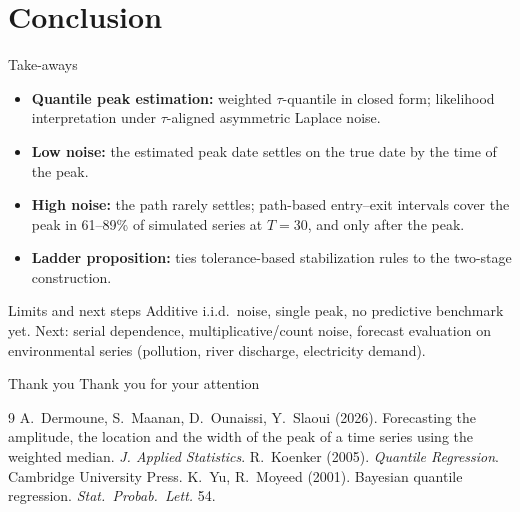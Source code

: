 \documentclass[aspectratio=54,10pt]{beamer}
\begin{document}
\section{Conclusion}

\begin{frame}{Take-aways}
\justifying
\begin{itemize}
	\item \textbf{Quantile peak estimation:} weighted $\tau$-quantile in closed form; likelihood interpretation under $\tau$-aligned asymmetric Laplace noise.
	\item \textbf{Low noise:} the estimated peak date settles on the true date by the time of the peak.
	\item \textbf{High noise:} the path rarely settles; path-based entry--exit intervals cover the peak in 61--89\% of simulated series at $T=30$, and \alert{only after the peak}.
	\item \textbf{Ladder proposition:} ties tolerance-based stabilization rules to the two-stage construction.
\end{itemize}
\vspace{0.2cm}
\begin{block}{Limits and next steps}
	Additive i.i.d.\ noise, single peak, no predictive benchmark yet. Next: serial dependence,
	multiplicative/count noise, forecast evaluation on environmental series
	(pollution, river discharge, electricity demand).
\end{block}
\end{frame}


\begin{frame}{Thank you}
\centering
{\Large Thank you for your attention}\\[0.6cm]
\small
\begin{thebibliography}{9}
	 A.~Dermoune, S.~Maanan, D.~Ounaissi, Y.~Slaoui (2026).
	Forecasting the amplitude, the location and the width of the peak of a time series
	using the weighted median. \emph{J. Applied Statistics}.
	 R.~Koenker (2005). \emph{Quantile Regression}. Cambridge University Press.
	 K.~Yu, R.~Moyeed (2001). Bayesian quantile regression. \emph{Stat.\ Probab.\ Lett.} 54.
\end{thebibliography}
\end{frame}

\end{document}
